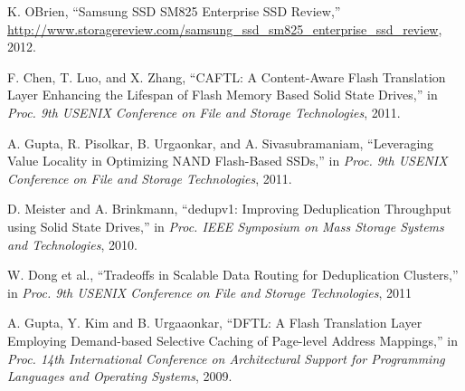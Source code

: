 \begin{thebibliography}{00}
K. OBrien,
``Samsung SSD SM825 Enterprise SSD Review,''
\url{http://www.storagereview.com/samsung_ssd_sm825_enterprise_ssd_review}, 2012.

F. Chen, T. Luo, and X. Zhang, 
``CAFTL: A Content-Aware Flash Translation Layer Enhancing the Lifespan of Flash Memory Based Solid State Drives,''
in \textit{Proc. 9th USENIX Conference on File and Storage Technologies}, 2011.

A. Gupta, R. Pisolkar, B. Urgaonkar, and A. Sivasubramaniam,
``Leveraging Value Locality in Optimizing NAND Flash-Based SSDs,''
in \textit{Proc. 9th USENIX Conference on File and Storage Technologies}, 2011.

D. Meister and A. Brinkmann,
``dedupv1: Improving Deduplication Throughput using Solid State Drives,''
in \textit{Proc. IEEE Symposium on Mass Storage Systems and Technologies}, 2010.

W. Dong et al.,
``Tradeoffs in Scalable Data Routing for Deduplication Clusters,''
in \textit{Proc. 9th USENIX Conference on File and Storage Technologies}, 2011


A. Gupta, Y. Kim and B. Urgaaonkar, 
``DFTL: A Flash Translation Layer Employing Demand-based Selective Caching of Page-level Address Mappings,''
in \textit{Proc. 14th International Conference on Architectural Support for Programming Languages and
Operating Systems}, 2009.





\end{thebibliography}
